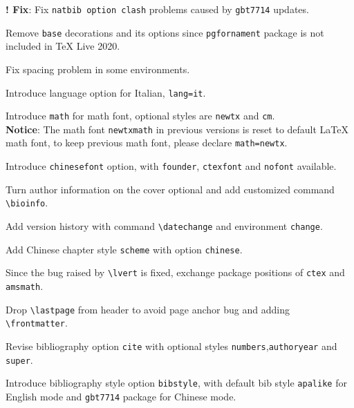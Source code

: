 \documentclass[11pt]{elegantbook}
\begin{document}


\begin{change}
  \item \textbf{! Fix}: Fix \lstinline{natbib option clash} problems caused by \lstinline{gbt7714} updates.
  \item Remove \lstinline{base} decorations and its options since \lstinline{pgfornament} package is not included in \TeX{} Live 2020.
  \item Fix spacing problem in some environments.
  \item Introduce language option for Italian, \lstinline{lang=it}.
\end{change}



\begin{change}
  \item Introduce \lstinline{math} for math font, optional styles are \lstinline{newtx} and \lstinline{cm}.\\
  \textbf{Notice}: The math font \lstinline{newtxmath} in previous versions is reset to default \LaTeX{} math font, to keep previous math font, please declare \lstinline{math=newtx}.
  \item Introduce \lstinline{chinesefont} option, with \lstinline{founder}, \lstinline{ctexfont} and \lstinline{nofont} available.
  \item Turn author information on the cover optional and add customized command \lstinline{\bioinfo}.
  \item Add version history with command \lstinline{\datechange} and environment \lstinline{change}.
  \item Add Chinese chapter style \lstinline{scheme} with option \lstinline{chinese}.
  \item Since the bug raised by \lstinline{\lvert} is fixed, exchange package positions of \lstinline{ctex} and \lstinline{amsmath}.
  \item Drop \lstinline{\lastpage} from header to avoid page anchor bug and adding \lstinline{\frontmatter}.
  \item Revise bibliography option \lstinline{cite} with optional styles \lstinline{numbers},\lstinline{authoryear} and \lstinline{super}.
  \item Introduce bibliography style option \lstinline{bibstyle}, with default bib style \lstinline{apalike} for English mode and \lstinline{gbt7714} package for Chinese mode.
\end{change}
\end{document}
